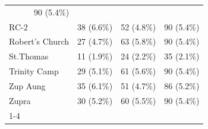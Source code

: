 \documentclass{article}
\begin{document}
\begin{table}[!h]
\begin{tabular}{llll}
  \multicolumn{1}{r}{90 (5.4\%)} \\
\multicolumn{1}{l}{\hspace{1em}RC-2} &
  \multicolumn{1}{r}{38 (6.6\%)} &
  \multicolumn{1}{r}{52 (4.8\%)} &
  \multicolumn{1}{r}{90 (5.4\%)} \\
\multicolumn{1}{l}{\hspace{1em}Robert's Church} &
  \multicolumn{1}{r}{27 (4.7\%)} &
  \multicolumn{1}{r}{63 (5.8\%)} &
  \multicolumn{1}{r}{90 (5.4\%)} \\
\multicolumn{1}{l}{\hspace{1em}St.Thomas} &
  \multicolumn{1}{r}{11 (1.9\%)} &
  \multicolumn{1}{r}{24 (2.2\%)} &
  \multicolumn{1}{r}{35 (2.1\%)} \\
\multicolumn{1}{l}{\hspace{1em}Trinity Camp} &
  \multicolumn{1}{r}{29 (5.1\%)} &
  \multicolumn{1}{r}{61 (5.6\%)} &
  \multicolumn{1}{r}{90 (5.4\%)} \\
\multicolumn{1}{l}{\hspace{1em}Zup Aung} &
  \multicolumn{1}{r}{35 (6.1\%)} &
  \multicolumn{1}{r}{51 (4.7\%)} &
  \multicolumn{1}{r}{86 (5.2\%)} \\
\multicolumn{1}{l}{\hspace{1em}Zupra} &
  \multicolumn{1}{r}{30 (5.2\%)} &
  \multicolumn{1}{r}{60 (5.5\%)} &
  \multicolumn{1}{r}{90 (5.4\%)} \\
\cline{1-4}
\end{tabular}
\end{table}
\end{document}
